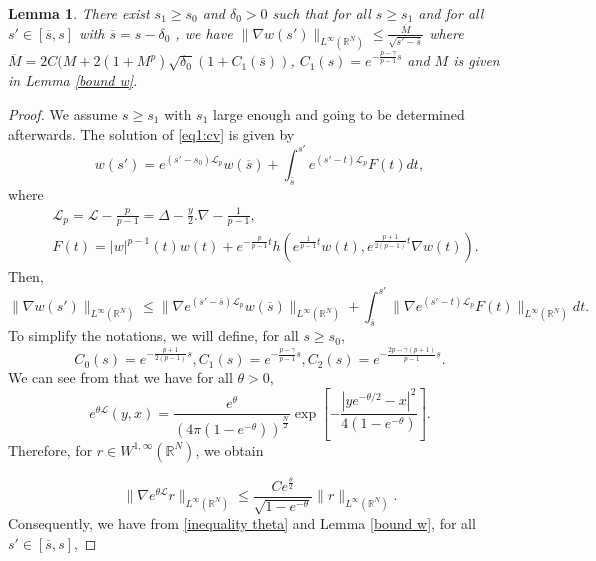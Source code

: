 \documentclass[11pt,a4paper]{article}
\newcommand{\1}{\mathbbm{1}}
\numberwithin{equation}{section}
\newcommand{\numberset}{\mathbb}
\newcommand{\R}{\numberset{R}}
\newtheorem{lemma}{Lemma}[section]
\theoremstyle{remark}
\begin{document}
\begin{lemma}
There exist $s_1\geq s_0$ and $\delta_0>0$ such that for all $s\geq s_1$ and for all $s'\in[\overline{s},s]$ with $\overline{s}=s-\delta_0$ , we have $\|\nabla w(s')\|_{L^\infty(\R^N)}\leq \frac{\overline{M}}{\sqrt{s'-\overline{s}}}$ where $\overline{M}=2C(M+2(1+M^p)\sqrt{\delta_0}(1+C_1(\bar s))$, $C_1(s)=e^{-\frac{p-\gamma}{p-1}s}$ and $M$ is given in Lemma \ref{bound w}.
\end{lemma}
\begin{proof}

We assume $s\geq s_1$ with $s_1$ large enough and going to be determined afterwards. The solution of \eqref{eq1:cv} is given by
\begin{equation*}
w(s')=e^{(s'-s_0)\mathcal{L}_p}w(\overline{s})+\int^{s'}_{\overline{s}}e^{(s'-t)\mathcal{L}_p}F(t)dt,
\end{equation*}
where
\begin{equation*}
\begin{split}
&\mathcal{L}_p=\mathcal{L}-\frac{p}{p-1}=\Delta-\frac{y}{2}.\nabla-\frac{1}{p-1},\\
&F(t)=|w|^{p-1}(t)w(t)+e^{-\frac{p}{p-1} t}h(e^{\frac{1}{p-1} t}w(t),e^{\frac{p+1}{2(p-1)}t}\nabla w(t)).
\end{split}
\end{equation*}
Then, 
\begin{equation}\label{w bound}
\|\nabla w(s')\|_{L^\infty(\R^N)}\leq\|\nabla e^{(s'-\overline{s})\mathcal{L}_p}w(\overline{s})\|_{L^\infty(\R^N)}+\int^{s'}_{\overline{s}}\|\nabla e^{(s'-t)\mathcal{L}_p}F(t)\|_{L^\infty(\R^N)}dt.
\end{equation}
To simplify the notations, we will define, for all $s\geq s_0$,
\begin{equation}
C_0(s)=e^{-\frac{p+1}{2(p-1)}s}, C_1(s)=e^{-\frac{p-\gamma}{p-1}s}, C_2(s)=e^{-\frac{2p-\overline{\gamma}(p+1)}{p-1}s}.
\end{equation}
We can see from \cite{BK1994} that we have for all $\theta>0$,
\begin{equation*}
e^{\theta\mathcal{L}}(y, x) =\frac{e^\theta}{(4\pi(1 - e^{-\theta}))^\frac{N}{2}}\exp \left[-\frac{|ye^{-\theta/2} - x|^2}{4(1 - e^{-\theta})}\right].
\end{equation*}
Therefore, for $r\in W^{1,\infty}(\R^N)$, we obtain

\begin{equation}\label{inequality theta}
\|\nabla e^{\theta\mathcal{L}}r\|_{L^\infty(\R^N)}\leq \frac{Ce^{\frac{\theta}{2}}}{\sqrt{1-e^{-\theta}}}\|r\|_{L^\infty(\R^N)}.
\end{equation}
Consequently, we have from  \eqref{inequality theta} and Lemma \ref{bound w}, for all $s'\in [\overline{s},s]$,


\end{proof}
\end{document}
